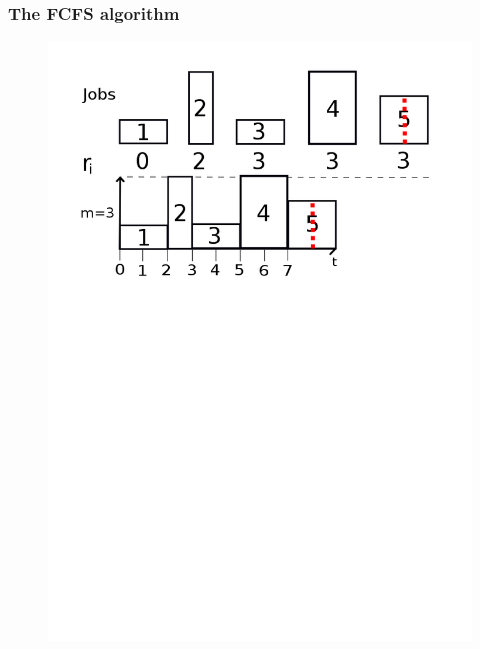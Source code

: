 \documentclass{beamer}
\begin{document}
\begin{frame}
  \frametitle{The FCFS algorithm}
  \begin{figure}[H]
          \centering
          \includegraphics[width=\textwidth]{FCFS.png}
          \caption{}
          \label{fig:fcfs_png}
  \end{figure}

\end{frame}
\end{document}
